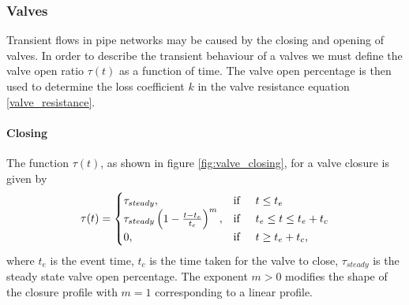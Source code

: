 \subsubsection{Valves}

Transient flows in pipe networks may be caused by the closing and opening of valves. In order to describe the transient behaviour of a valves we must define the valve open ratio $\tau(t)$ as a function of time. The valve open percentage is then used to determine the loss coefficient $k$ in the valve resistance equation \eqref{valve_resistance}.

\paragraph{Closing}
 
 The function $\tau(t)$, as shown in figure \ref{fig:valve_closing}, for a valve closure is given by 
\begin{align}\label{valve_closure_function}
\tau(t) = 
\begin{cases} 
\tau_{steady}, &\text{if} \hspace{0.5cm} t \leq t_e \\
\tau_{steady} \left( 1 - \frac{t-t_e}{t_c} \right)^m, &\text{if} \hspace{0.5cm} t_e \leq t \leq t_e + t_c \\
0, &\text{if} \hspace{0.5cm} t \geq t_e + t_c, 
\end{cases}
\end{align} 
where $t_e$ is the event time, $t_c$ is the time taken for the valve to close, $\tau_{steady}$ is the steady state valve open percentage. The exponent $m > 0$ modifies the shape of the closure profile with $m=1$ corresponding to a linear profile. 
 

